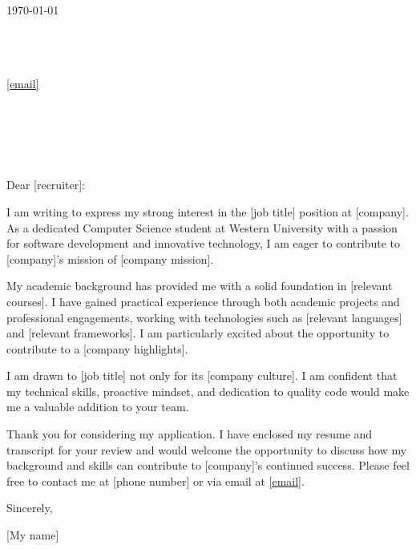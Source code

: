 \documentclass[11pt]{article}
\begin{document}
\begin{flushright}
\today
\end{flushright}

\noindent [My name] \\
[My location] \\
[phone number] \\
\href{mailto:[email]}{[email]} \\

\vspace{1em}

\noindent [company] \\
[recruiter position (skip if none are provided)] \\
[recruiter (skip if none are provided)] \\
[company location] \\

\vspace{1em}

\noindent Dear [recruiter]:

\setlength{\parindent}{15pt}
\setlength{\parskip}{0.75em}

I am writing to express my strong interest in the [job title] position at [company]. As a dedicated Computer Science student at Western University with a passion for software development and innovative technology, I am eager to contribute to [company]’s mission of [company mission].

My academic background has provided me with a solid foundation in [relevant courses]. I have gained practical experience through both academic projects and professional engagements, working with technologies such as [relevant languages] and [relevant frameworks]. I am particularly excited about the opportunity to contribute to a [company highlights].

I am drawn to [job title] not only for its [company culture]. I am confident that my technical skills, proactive mindset, and dedication to quality code would make me a valuable addition to your team.

Thank you for considering my application. I have enclosed my resume and transcript for your review and would welcome the opportunity to discuss how my background and skills can contribute to [company]’s continued success. Please feel free to contact me at [phone number] or via email at \href{[email]}{[email]}.

\setlength{\parindent}{0pt}

\vspace{1em}
Sincerely,

\vspace{1em}
[My name]
\end{document}

